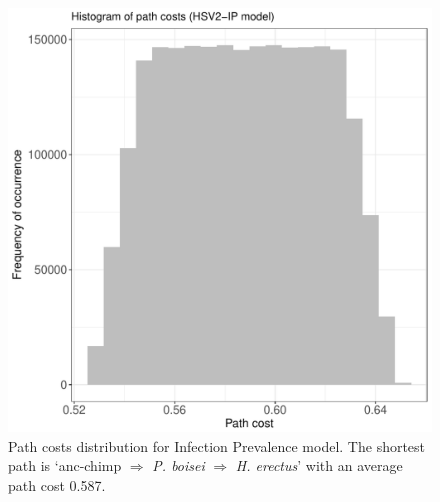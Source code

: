 \documentclass[fleqn,10pt]{wlscirep}
\begin{document}
\begin{figure}[!htbp]
  \centering
  \includegraphics[width=\textwidth]{figs/beta_path_costs}
  \caption{Path costs distribution for Infection Prevalence model. The shortest path is ‘anc-chimp $\Rightarrow$ \textit{P. boisei} $\Rightarrow$ \textit{H. erectus}’ with an average path cost 0.587.}
  \label{fig:beta}   
\end{figure}     
\end{document}
